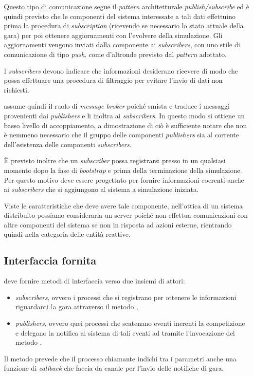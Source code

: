 Questo tipo di comunicazione segue il \textit{pattern} architetturale \textit{\mbox{publish/subscribe}} ed è quindi previsto che le componenti del sistema interessate a tali dati effettuino prima la procedura di \textit{subscription} (ricevendo se necessario lo stato attuale della gara) per poi ottenere aggiornamenti con l'evolvere della simulazione. Gli aggiornamenti vengono inviati dalla componente \evdisp{} ai \textit{subscribers}, con uno stile di comunicazione di tipo \textit{push}, come d'altronde previsto dal \textit{pattern} adottato.

I \textit{subscribers} devono indicare che informazioni desiderano ricevere di modo che \evdisp{} possa effettuare una procedura di filtraggio per evitare l'invio di dati non richiesti.

\evdisp{} assume quindi il ruolo di \textit{message broker} poiché smista e traduce i messaggi provenienti dai \textit{publishers} e li inoltra ai \textit{subscribers}. In questo modo si ottiene un basso livello di accoppiamento, a dimostrazione di ciò è sufficiente notare che non è nemmeno necessario che il gruppo delle componenti \textit{publishers} sia al corrente dell'esistenza delle componenti \textit{subscribers}.

\`E previsto inoltre che un \textit{subscriber} possa registrarsi presso \evdisp{} in un qualsiasi momento dopo la fase di \textit{bootstrap} e prima della terminazione della simulazione. Per questo motivo \evdisp{} deve essere progettato per fornire informazioni coerenti anche ai \textit{subscribers} che si aggiungono al sistema a simulazione iniziata.

Viste le caratteristiche che deve avere tale componente, nell'ottica di un sistema distribuito possiamo considerarla un server poiché non effettua comunicazioni con altre componenti del sistema se non in risposta ad azioni esterne, rientrando quindi nella categoria delle entità reattive.

\subsection*{Interfaccia fornita}
\evdisp{} deve fornire metodi di interfaccia verso due insiemi di attori:
\begin{itemize}
\item \textit{subscribers}, ovvero i processi che si registrano per ottenere le informazioni riguardanti la gara attraverso il metodo ,
\item \textit{publishers}, ovvero quei processi che scatenano eventi inerenti la competizione e delegano la notifica al sistema di tali eventi ad \evdisp{} tramite l'invocazione del metodo .
\end{itemize}
Il metodo  prevede che il processo chiamante indichi tra i parametri anche una funzione di \textit{callback} che faccia da canale per l'invio delle notifiche di gara.

